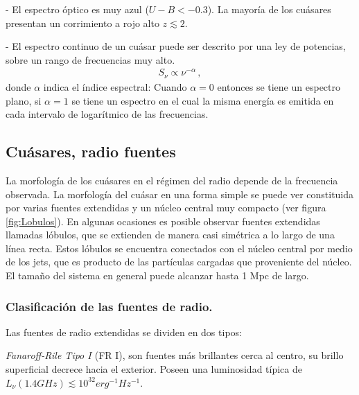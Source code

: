 - El espectro óptico es muy azul ($U-B < -0.3$). La mayoría de los cuásares presentan un corrimiento a rojo alto  $z \lesssim 2$.

- El espectro continuo de un cuásar puede ser descrito por una ley de potencias, sobre un rango de frecuencias muy alto.
%
\begin{align}
S_{\nu} \propto \nu^{-\alpha} \,,
\end{align}
%
 donde $\alpha$ indica el índice espectral: Cuando $\alpha=0$ entonces se tiene un espectro plano, si $\alpha=1$ se tiene un espectro en el cual la misma energía es emitida en cada intervalo de logarítmico de las frecuencias. 


	\subsection{Cuásares, radio fuentes}
	\label{subsec:}

La morfología de los cuásares en el régimen del radio depende de la frecuencia observada. La morfología del cuásar en una forma simple se puede ver constituida por varias fuentes extendidas y un núcleo central muy compacto (ver figura \ref{fig:Lobulos}). En algunas ocasiones es posible observar fuentes extendidas llamadas lóbulos, que se extienden de manera casi simétrica a lo largo de una línea recta. Estos lóbulos se encuentra conectados con el núcleo central por medio de los jets, que es producto de las partículas cargadas que proveniente del núcleo. El tamaño del sistema en general puede alcanzar hasta 1 Mpc de largo. %

	\subsubsection{Clasificación de las fuentes de radio.}
	\label{subsubsec: clasification_source_radio}

Las fuentes de radio extendidas se dividen en dos tipos:

{\it{Fanaroff-Rile Tipo I }} (FR I), son fuentes más brillantes cerca al centro, su brillo superficial decrece hacia el exterior. Poseen una luminosidad típica de $L_{\nu}(1.4GHz)\lesssim 10^{32} erg^{-1} Hz^{-1}$.

